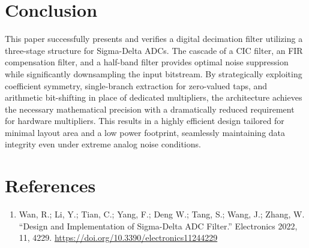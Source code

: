 \documentclass[12pt, a4paper]{article}
\begin{document}
\section{Conclusion}
This paper successfully presents and verifies a digital decimation filter utilizing a three-stage structure for Sigma-Delta ADCs. The cascade of a CIC filter, an FIR compensation filter, and a half-band filter provides optimal noise suppression while significantly downsampling the input bitstream. By strategically exploiting coefficient symmetry, single-branch extraction for zero-valued taps, and arithmetic bit-shifting in place of dedicated multipliers, the architecture achieves the necessary mathematical precision with a dramatically reduced requirement for hardware multipliers. This results in a highly efficient design tailored for minimal layout area and a low power footprint, seamlessly maintaining data integrity even under extreme analog noise conditions.

\section*{References}
\begin{enumerate}
    \item Wan, R.; Li, Y.; Tian, C.; Yang, F.; Deng W.; Tang, S.; Wang, J.; Zhang, W. ``Design and Implementation of Sigma-Delta ADC Filter.'' Electronics 2022, 11, 4229. \url{https://doi.org/10.3390/electronics11244229}
\end{enumerate}
\end{document}
